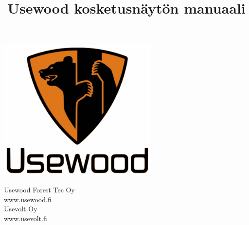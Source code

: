 \documentclass[12pt,a4paper,finnish]{uvmanual}
\title{Usewood kosketusnäytön manuaali}
\begin{document}
%	
\thispagestyle{empty}
\vspace*{-1cm}\noindent
\begin{center}
\includegraphics[width=8cm]{img/uw_logo_color.png}   %
\end{center}
\vspace{1cm}
\begin{center}
\end{center}



\vspace{2.8cm}
\maketitle
\vspace{2.8cm}


\begin{minipage}[c]{8.8cm}
  \begin{spacing}{1.0}
    \textsf{Usewood Forest Tec Oy}\\
    \textsf{www.usewood.fi}\\
    \textsf{Usevolt Oy}\\
    \textsf{www.usevolt.fi}\\
  \end{spacing}
\end{minipage}

\if@twoside
\clearpage
\fi

\setcounter{page}{0} %
\end{document}
